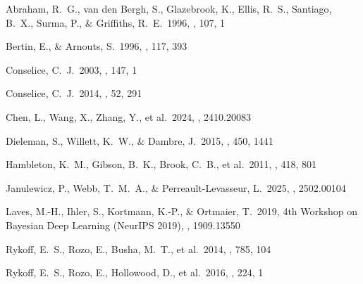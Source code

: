 \documentclass[twocolumn,10pt]{aastex631}
\begin{document}
\begin{thebibliography}{99}

Abraham, R.~G., van den Bergh, S., Glazebrook, K., Ellis, R.~S., Santiago, B.~X., Surma, P., \& Griffiths, R.~E.\ 1996, \apjs, 107, 1

Bertin, E., \& Arnouts, S.\ 1996, \aaps, 117, 393

Conselice, C.~J.\ 2003, \apjs, 147, 1

Conselice, C.~J.\ 2014, \araa, 52, 291

Chen, L., Wang, X., Zhang, Y., et al.\ 2024, \arxiv, 2410.20083

Dieleman, S., Willett, K.~W., \& Dambre, J.\ 2015, \mnras, 450, 1441

Hambleton, K.~M., Gibson, B.~K., Brook, C.~B., et al.\ 2011, \mnras, 418, 801

Janulewicz, P., Webb, T.~M.~A., \& Perreault-Levasseur, L.\ 2025, \arxiv, 2502.00104

Laves, M.-H., Ihler, S., Kortmann, K.-P., \& Ortmaier, T.\ 2019, 4th Workshop on Bayesian Deep Learning (NeurIPS 2019), \arxiv, 1909.13550

Rykoff, E.~S., Rozo, E., Busha, M.~T., et al.\ 2014, \apj, 785, 104

Rykoff, E.~S., Rozo, E., Hollowood, D., et al.\ 2016, \apjs, 224, 1

\end{thebibliography}
\end{document}
